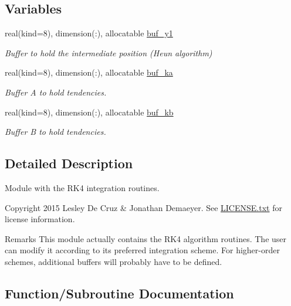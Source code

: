 \subsection*{Variables}
\begin{DoxyCompactItemize}
\item 
real(kind=8), dimension(\+:), allocatable \hyperlink{namespacerk4__integrator_a43998877d687c6b6c99050930aa50287}{buf\+\_\+y1}
\begin{DoxyCompactList}\small\item\em Buffer to hold the intermediate position (Heun algorithm) \end{DoxyCompactList}\item 
real(kind=8), dimension(\+:), allocatable \hyperlink{namespacerk4__integrator_add2986973e491454b6af98e9a44b12d7}{buf\+\_\+ka}
\begin{DoxyCompactList}\small\item\em Buffer A to hold tendencies. \end{DoxyCompactList}\item 
real(kind=8), dimension(\+:), allocatable \hyperlink{namespacerk4__integrator_a5e96789cc7477207582c4115459307c3}{buf\+\_\+kb}
\begin{DoxyCompactList}\small\item\em Buffer B to hold tendencies. \end{DoxyCompactList}\end{DoxyCompactItemize}


\subsection{Detailed Description}
Module with the R\+K4 integration routines. 

\begin{DoxyCopyright}{Copyright}
2015 Lesley De Cruz \& Jonathan Demaeyer. See \hyperlink{LICENSE_8txt}{L\+I\+C\+E\+N\+S\+E.\+txt} for license information. 
\end{DoxyCopyright}
\begin{DoxyRemark}{Remarks}
This module actually contains the R\+K4 algorithm routines. The user can modify it according to its preferred integration scheme. For higher-\/order schemes, additional buffers will probably have to be defined. 
\end{DoxyRemark}


\subsection{Function/\+Subroutine Documentation}
